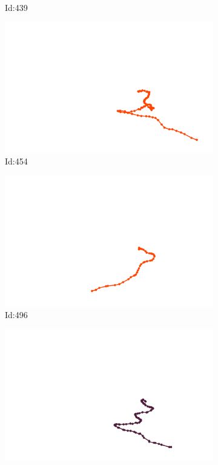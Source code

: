 \documentclass[12pt,twoside]{report}
\begin{document}
\begin{figure}
\begin{subfigure}[b]{0.20\textwidth}
\caption{Id:439}
\end{subfigure}
\begin{subfigure}[b]{0.20\textwidth}
\centering
\includegraphics[width=\textwidth]{../trajectories/454.png}
\caption{Id:454}
\end{subfigure}
\begin{subfigure}[b]{0.20\textwidth}
\centering
\includegraphics[width=\textwidth]{../trajectories/496.png}
\caption{Id:496}
\end{subfigure}
\begin{subfigure}[b]{0.20\textwidth}
\centering
\includegraphics[width=\textwidth]{../trajectories/498.png}

\end{subfigure}
\end{figure}
\end{document}
